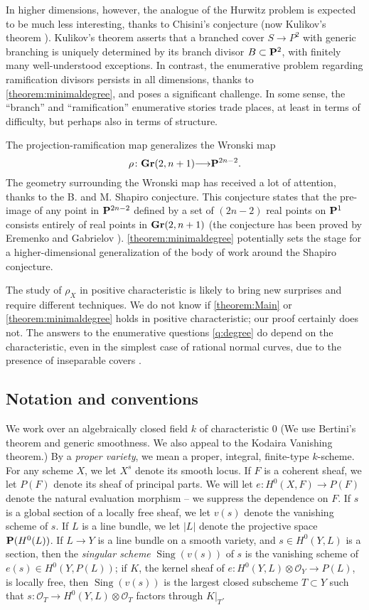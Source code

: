 \documentclass[11pt,reqno]{amsart}
\theoremstyle{plain}
\theoremstyle{definition}
\theoremstyle{remark}
\numberwithin{equation}{section}
\DeclareMathOperator{\sing}{Sing}
\newcommand{\cO}{{\mathcal O}}
\renewcommand{\to}{{\longrightarrow}}
\numberwithin{equation}{section}
\begin{document}
In higher dimensions, however, the analogue of the Hurwitz problem is expected to be much less interesting, thanks to Chisini's conjecture (now Kulikov's theorem \cite{1064-5632-63-6-A03}).
Kulikov's theorem asserts that a branched cover $S \to P^2$ with generic branching is uniquely determined by its branch divisor $B \subset \P^{2}$, with finitely many well-understood exceptions.
In contrast, the enumerative problem regarding ramification divisors persists in all dimensions, thanks to \autoref{theorem:minimaldegree}, and poses a significant challenge.
In some sense, the ``branch'' and ``ramification'' enumerative stories trade places, at least in terms of difficulty, but perhaps also in terms of structure.

The projection-ramification map generalizes the Wronski map
\[ \rho \from \Gr(2, n+1) \to \P^{2n-2}.\]
The geometry surrounding the Wronski map has received a lot of attention, thanks to the B. and M. Shapiro conjecture.
This conjecture states that the pre-image of any point in $\P^{2n-2}$ defined by a set of $(2n-2)$ real points on $\P^1$ consists entirely of real points in $\Gr(2, n+1)$ \cite{sottile2000} (the conjecture has been proved by Eremenko and Gabrielov \cite{Erem/Gabr1}).
\autoref{theorem:minimaldegree} potentially sets the stage for a higher-dimensional generalization of the body of work around the Shapiro conjecture.

The study of $\rho_X$ in positive characteristic is likely to bring new surprises and require different techniques.
We do not know if \autoref{theorem:Main} or \autoref{theorem:minimaldegree} holds in positive characteristic; our proof certainly does not.
The answers to the enumerative questions \autoref{q:degree} do depend on the characteristic, even in the simplest case of rational normal curves, due to the presence of inseparable covers \cite{MR2218904}.

\subsection{Notation and conventions} We work over an algebraically closed field
$k$ of characteristic $0$ (We use Bertini's theorem and generic smoothness. We
also appeal to the Kodaira Vanishing theorem.) By a {\sl proper variety}, we mean a proper, integral, finite-type $k$-scheme. For any scheme $X$, we let $X^{s}$ denote its smooth locus. If $F$ is a coherent sheaf, we let $P(F)$ denote its sheaf of principal parts. We will let $e: H^{0}(X,F) \to P(F)$ denote the natural evaluation morphism -- we suppress the dependence on $F$. If $s$ is a global section of a locally free sheaf, we let $v(s)$ denote the vanishing scheme of $s$.  If $L$ is a line bundle, we let $|L|$ denote the projective space $\P(H^{0}(L))$.  If $L \to Y$ is a line bundle on a smooth variety, and $s \in H^{0}(Y,L)$ is a section, then the {\sl singular scheme} $\sing(v(s))$ of $s$ is the vanishing scheme of $e(s) \in H^{0}(Y,P(L))$; if $K$, the kernel sheaf of $e : H^{0}(Y,L) \otimes \cO_{Y} \to P(L)$, is locally free, then $\sing(v(s))$ is the largest closed subscheme $T \subset Y$  such that $s: \cO_{T} \to H^{0}(Y,L) \otimes \cO_{T}$ factors through $K|_{T}$.  
\end{document}
